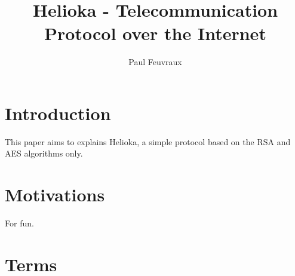 \documentclass[a4paper,10pt]{article}
\title{Helioka - Telecommunication Protocol over the Internet}
\author{Paul Feuvraux}
\begin{document}
\maketitle

\section{Introduction}
This paper aims to explains Helioka, a simple protocol based on the RSA and AES algorithms only.

\section{Motivations}
For fun.

\section{Terms}
\end{document}
